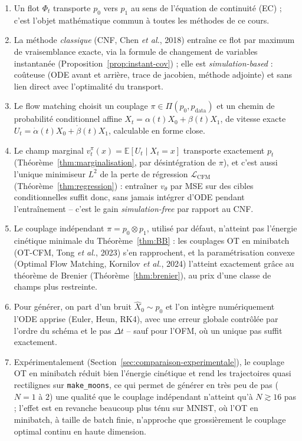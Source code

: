 \documentclass[11pt,a4paper]{article}
\theoremstyle{definition}
\theoremstyle{plain}
\theoremstyle{remark}
\newcommand{\E}{\mathbb{E}}
\begin{document}
\begin{enumerate}[leftmargin=*]
  \item Un flot $\Phi_t$ transporte $p_0$ vers $p_1$ au sens de l'équation de
  continuité (EC) ; c'est l'objet mathématique commun à toutes les méthodes de
  ce cours.
  \item La méthode \emph{classique} (CNF, Chen \emph{et al.}, 2018) entraîne ce
  flot par maximum de vraisemblance exacte, via la formule de changement de
  variables instantanée (Proposition~\ref{prop:instant-cov}) ; elle est
  \emph{simulation-based} : coûteuse (ODE avant et arrière, trace de jacobien,
  méthode adjointe) et sans lien direct avec l'optimalité du transport.
  \item Le flow matching choisit un couplage $\pi\in\Pi(p_0,p_{\mathrm{data}})$
  et un chemin de probabilité conditionnel affine
  $X_t=\alpha(t)X_0+\beta(t)X_1$, de vitesse exacte
  $U_t=\dot\alpha(t)X_0+\dot\beta(t)X_1$, calculable en forme close.
  \item Le champ marginal $v_t^\pi(x)=\E[U_t\mid X_t=x]$ transporte
  exactement $p_t$ (Théorème~\ref{thm:marginalisation}, par désintégration de
  $\pi$), et c'est aussi l'unique minimiseur $L^2$ de la perte de régression
  $\mathcal{L}_{\mathrm{CFM}}$ (Théorème~\ref{thm:regression}) : entraîner
  $v_\theta$ par MSE sur des cibles conditionnelles suffit donc, sans jamais
  intégrer d'ODE pendant l'entraînement -- c'est le gain \emph{simulation-free}
  par rapport au CNF.
  \item Le couplage indépendant $\pi=p_0\otimes p_1$, utilisé par défaut,
  n'atteint pas l'énergie cinétique minimale du Théorème~\ref{thm:BB} :
  les couplages OT en minibatch (OT-CFM, Tong \emph{et al.}, 2023) s'en
  rapprochent, et la paramétrisation convexe (Optimal Flow Matching, Kornilov
  \emph{et al.}, 2024) l'atteint exactement grâce au théorème de Brenier
  (Théorème~\ref{thm:brenier}), au prix d'une classe de champs plus restreinte.
  \item Pour générer, on part d'un bruit $\widehat X_0\sim p_0$ et l'on intègre
  numériquement l'ODE apprise (Euler, Heun, RK4), avec une erreur globale
  contrôlée par l'ordre du schéma et le pas $\Delta t$ -- sauf pour l'OFM, où un
  unique pas suffit exactement.
  \item Expérimentalement (Section~\ref{sec:comparaison-experimentale}), le couplage OT en
  minibatch réduit bien l'énergie cinétique et rend les trajectoires quasi rectilignes sur
  \texttt{make\_moons}, ce qui permet de générer en très peu de pas ($N=1$ à $2$) une qualité que le
  couplage indépendant n'atteint qu'à $N\gtrsim 16$ pas ; l'effet est en revanche beaucoup plus
  ténu sur MNIST, où l'OT en minibatch, à taille de batch finie, n'approche que grossièrement le
  couplage optimal continu en haute dimension.
\end{enumerate}
\end{document}
